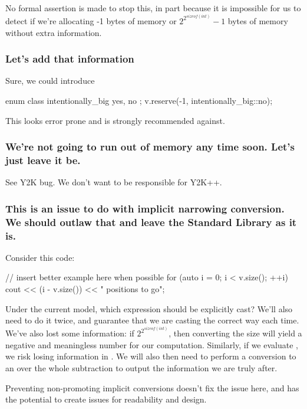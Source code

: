 No formal assertion is made to stop this, in part because it is impossible for us to detect if we're
allocating -1 bytes of memory or $2^{2^{sizeof(int)}} - 1$ bytes of memory without extra
information.

\subsubsection*{Let's add that information}
Sure, we could introduce

\begin{codeblock}
enum class intentionally_big { yes, no };
v.reserve(-1, intentionally_big::no);
\end{codeblock}

This looks error prone and is strongly recommended against.

\subsubsection*{We're not going to run out of memory any time soon. Let's just leave it be.}
See Y2K bug. We don't want to be responsible for Y2K++.

\subsubsection*{This is an issue to do with implicit narrowing conversion. We should outlaw that and
leave the Standard Library as it is.}

Consider this code:

\begin{codeblock}
// insert better example here when possible
for (auto i = 0; i < v.size(); ++i) {
   cout << (i - v.size()) << " positions to go\n";
}
\end{codeblock}

Under the current model, which expression should be explicitly cast? We'll also need to do it twice,
and guarantee that we are casting the correct way each time. We've also lost some information: if
 $2^{2^{sizeof(int)}}$, then converting the size will yield a negative and
meaningless number for our computation. Similarly, if we evaluate
, we risk losing information in . We will also then
need to perform a conversion to an  over the whole subtraction to output the information
we are truly after.

Preventing non-promoting implicit conversions doesn't fix the issue here, and has the potential to
create issues for readability and design.

